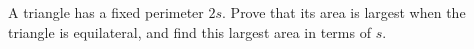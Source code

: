 A triangle has a fixed perimeter $2s$. Prove that its area is largest when the triangle is equilateral, and find this largest area in terms of $s$.
